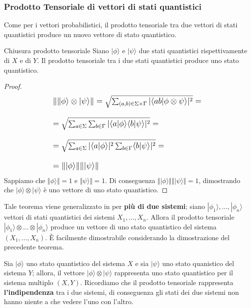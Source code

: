 \subsubsection{Prodotto Tensoriale di vettori di stati quantistici}
Come per i vettori probabilistici, il prodotto tensoriale tra due vettori di stati quantistici produce un nuovo vettore di stato quantistico.
\begin{theorem}{Chiusura prodotto tensoriale}{}
    Siano $|\phi\rangle$ e $|\psi\rangle$ due stati quantistici rispettivamente di $X$ e di $Y$. Il prodotto tensoriale tra i due stati quantistici produce uno stato quantistico.
\end{theorem}
\begin{proof}
\begin{equation*}
\large
\begin{array}{l}

    \Vert \|\phi\rangle \otimes |\psi\rangle \Vert = \sqrt{\sum_{(a,b) \in \Sigma \times \Gamma} |\langle ab|\phi \otimes \psi \rangle|^2} = \\ \\
    = \sqrt{\sum_{a \in \Sigma} \sum_{b \in \Gamma} |\langle a|\phi\rangle \langle b | \psi \rangle|^2} = \\ \\
    = \sqrt{\sum_{a \in \Sigma} |\langle a|\phi\rangle|^2 \sum_{b \in \Gamma} \langle b | \psi \rangle|^2} = \\ \\
    = \Vert |\phi\rangle \Vert \Vert |\psi\rangle \Vert
    
\end{array}
\end{equation*}
Sappiamo che $\Vert \phi \rangle \Vert = 1$ e $\Vert \psi \rangle \Vert = 1$. Di conseguenza $\Vert |\phi\rangle \Vert \Vert |\psi\rangle \Vert = 1$, dimostrando che $|\phi\rangle \otimes |\psi\rangle$ è uno vettore di uno stato quantistico.
\end{proof}
Tale teorema viene generalizzato in per \textbf{più di due sistemi}; siano $|\phi_1\rangle, \hdots, |\phi_n\rangle$ vettori di stati quantistici dei sistemi $X_1, \hdots, X_n$. Allora il prodotto tensoriale $|\phi_1\rangle \otimes \hdots \otimes |\phi_n\rangle$ produce un vettore di uno stato quantistico del sistema $(X_1, \hdots, X_n)$. È facilmente dimostrabile considerando la dimostrazione del precedente teorema.

Sia $|\phi\rangle$ uno stato quantistico del sistema $X$ e sia $|\psi\rangle$ uno stato quanistico del sistema $Y$; allora, il vettore $|\phi\rangle \otimes |\psi\rangle$ rappresenta uno stato quantistico per il sistema multiplo $(X,Y)$. Ricordiamo che il prodotto tensoriale rappresenta \textbf{l'indipendenza} tra i due sistemi, di conseguenza gli stati dei due sistemi non hanno niente a che vedere l'uno con l'altro.
